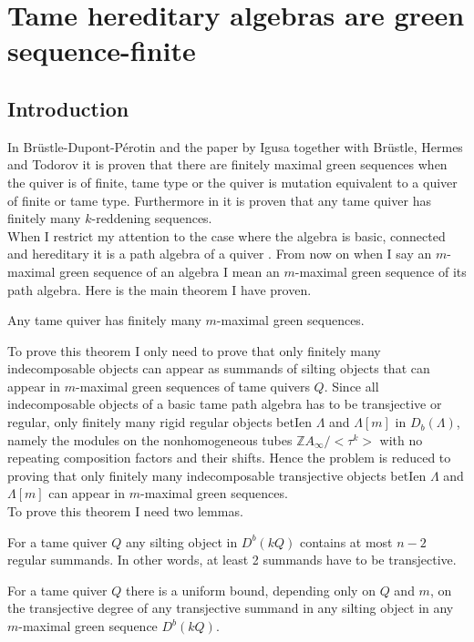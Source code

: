 \chapter{Tame hereditary algebras are green sequence-finite}\label{C2}
\section{Introduction}
 In Br\"ustle-Dupont-P\'erotin \cite{BDP13} and the paper by Igusa together with Br\"ustle, Hermes and Todorov \cite{BHIT15} it is proven that there are finitely maximal green sequences when the quiver is of finite, tame type or the quiver is mutation equivalent to a quiver of finite or tame type. Furthermore in \cite{BHIT15} it is proven that any tame quiver has finitely many $k$-reddening sequences.\\
\indent When I restrict my attention to the case where the algebra is basic, connected and hereditary it is a path algebra of a quiver \cite{ASS06}. From now on when I say an $m$-maximal green sequence of an algebra I mean an $m$-maximal green sequence of its path algebra. Here is the main theorem I have proven.\\
\begin{theorem}
Any tame quiver has finitely many $m$-maximal green sequences.\label{C3T}
\end{theorem}
\indent To prove this theorem I only need to prove that only finitely many indecomposable objects can appear as summands of silting objects that can appear in $m$-maximal green sequences of tame quivers $Q$. Since all indecomposable objects of a basic tame path algebra has to be transjective or regular, only finitely many rigid regular objects betIen $\Lambda$ and $\Lambda[m]$ in $D_b(\Lambda)$, namely the modules on the nonhomogeneous tubes $\mathbb{Z}A_\infty/<\tau^k>$ with no repeating composition factors and their shifts. Hence the problem is reduced to proving that only finitely many indecomposable transjective objects betIen $\Lambda$ and $\Lambda[m]$ can appear in $m$-maximal green sequences.\\
\indent To prove this theorem I need two lemmas.\\
\begin{lemma}\label{def:C3L1}
For a tame quiver $Q$ any silting object in $D^b(kQ)$ contains at most $n-2$ regular summands. In other words, at least 2 summands have to be transjective. 
\end{lemma}
\begin{lemma}\label{def:C3L2}
For a tame quiver $Q$ there is a uniform bound, depending only on $Q$ and $m$, on the transjective degree of any transjective summand in any silting object in any $m$-maximal green sequence $D^b(kQ)$.
\end{lemma}
